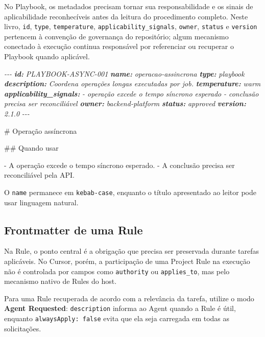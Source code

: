 \documentclass[
  10pt,
  a4paper,
  oneside]{book}
\newenvironment{Shaded}{}{}
\newcommand{\AnnotationTok}[1]{\textcolor[rgb]{0.38,0.63,0.69}{\textbf{\textit{#1}}}}
\newcommand{\CommentTok}[1]{\textcolor[rgb]{0.38,0.63,0.69}{\textit{#1}}}
\newcommand{\FunctionTok}[1]{\textcolor[rgb]{0.02,0.16,0.49}{#1}}
\newcommand{\NormalTok}[1]{#1}
\newcommand{\SpecialStringTok}[1]{\textcolor[rgb]{0.73,0.40,0.53}{#1}}
\renewenvironment{Shaded}{\begin{snugshade}}{\end{snugshade}}%
\begin{document}
No Playbook, os metadados precisam tornar sua responsabilidade e os
sinais de aplicabilidade reconhecíveis antes da leitura do procedimento
completo. Neste livro, \texttt{id}, \texttt{type}, \texttt{temperature},
\texttt{applicability\_signals}, \texttt{owner}, \texttt{status} e
\texttt{version} pertencem à convenção de governança do repositório;
algum mecanismo conectado à execução continua responsável por
referenciar ou recuperar o Playbook quando aplicável.

\begin{Shaded}
\begin{Highlighting}[]
\CommentTok{{-}{-}{-}}
\AnnotationTok{id:}\CommentTok{ PLAYBOOK{-}ASYNC{-}001}
\AnnotationTok{name:}\CommentTok{ operacao{-}assincrona}
\AnnotationTok{type:}\CommentTok{ playbook}
\AnnotationTok{description:}\CommentTok{ Coordena operações longas executadas por job.}
\AnnotationTok{temperature:}\CommentTok{ warm}
\AnnotationTok{applicability\_signals:}
\CommentTok{  {-} operação excede o tempo síncrono esperado}
\CommentTok{  {-} conclusão precisa ser reconciliável}
\AnnotationTok{owner:}\CommentTok{ backend{-}platform}
\AnnotationTok{status:}\CommentTok{ approved}
\AnnotationTok{version:}\CommentTok{ 2.1.0}
\CommentTok{{-}{-}{-}}

\FunctionTok{\# Operação assíncrona}

\FunctionTok{\#\# Quando usar}

\SpecialStringTok{{-} }\NormalTok{A operação excede o tempo síncrono esperado.}
\SpecialStringTok{{-} }\NormalTok{A conclusão precisa ser reconciliável pela API.}
\end{Highlighting}
\end{Shaded}

O \texttt{name} permanece em \texttt{kebab-case}, enquanto o título
apresentado ao leitor pode usar linguagem natural.

\hypertarget{frontmatter-de-uma-rule}{%
\subsection{Frontmatter de uma Rule}\label{frontmatter-de-uma-rule}}

Na Rule, o ponto central é a obrigação que precisa ser preservada
durante tarefas aplicáveis. No Cursor, porém, a participação de uma
Project Rule na execução não é controlada por campos como
\texttt{authority} ou \texttt{applies\_to}, mas pelo mecanismo nativo de
Rules do host.

Para uma Rule recuperada de acordo com a relevância da tarefa, utilize o
modo \textbf{Agent Requested}: \texttt{description} informa ao Agent
quando a Rule é útil, enquanto \texttt{alwaysApply:\ false} evita que
ela seja carregada em todas as solicitações.
\end{document}
